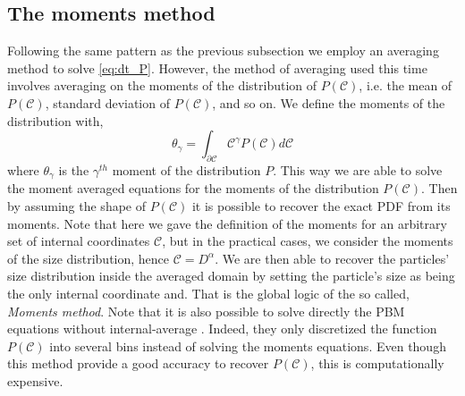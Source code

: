 \subsection{The moments method}

Following the same pattern as the previous subsection we employ an averaging method to solve \ref{eq:dt_P}.
However, the method of averaging used this time involves averaging on the moments of the distribution of $P(\mathscr{C})$, i.e. the mean of $P(\mathscr{C})$, standard deviation of $P(\mathscr{C})$, and so on. 
We define the moments of the distribution with, 
\begin{equation}
    \theta_{\gamma} = \int_{\partial \mathscr{C}} \mathscr{C}^\gamma P(\mathscr{C})  d\mathscr{C}
    \label{eq:g}
\end{equation}
where $\theta_{\gamma}$ is the $\gamma^{th}$ moment of the distribution $P$.
This way we are able to solve the moment averaged equations for the moments of the distribution $P(\mathscr{C})$. 
Then by assuming the shape of $P(\mathscr{C})$ it is possible to recover the exact PDF from its moments.
Note that here we gave the definition of the moments for an arbitrary set of internal coordinates $\mathscr{C}$, but in the practical cases, we consider the moments of the size distribution, hence $\mathscr{C} = D^\alpha$.
We are then able to recover the particles' size distribution inside the averaged domain by setting the particle's size as being the only internal coordinate and.
That is the global logic of the so called, \textit{Moments method}.  
Note that it is also possible to solve directly the PBM equations without internal-average \citep{salehi2017population}.
Indeed, they only discretized the function $P(\mathscr{C})$ into several bins instead of solving the moments equations. 
Even though this method provide a good accuracy to recover $P(\mathscr{C})$, this is computationally expensive.

